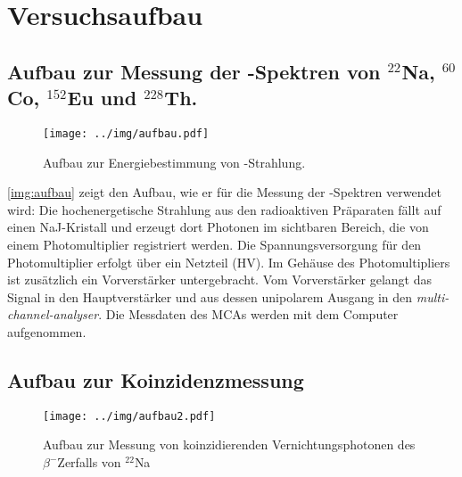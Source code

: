 \section{Versuchsaufbau}

\subsection{Aufbau zur Messung der \textgamma-Spektren von \texorpdfstring{${}^{22}$Na, ${}^{60}$Co, ${}^{152}$Eu und ${}^{228}$Th}{22-Na, 60-Co, 152-Eu und 228-Th}.}

\begin{figure}[H]
\begin{center}
  \texttt{[image: ../img/aufbau.pdf]}
  \caption[---]{Aufbau zur Energiebestimmung von \textgamma-Strahlung.}
  \label{img:aufbau}
\end{center}
\end{figure}

\autoref{img:aufbau} zeigt den Aufbau, wie er für die Messung der \textgamma-Spektren verwendet wird:
Die hochenergetische Strahlung aus den radioaktiven Präparaten fällt auf einen NaJ-Kristall und
erzeugt dort Photonen im sichtbaren Bereich, die von einem Photomultiplier registriert werden.
Die Spannungsversorgung für den Photomultiplier erfolgt über ein Netzteil (HV).
Im Gehäuse des Photomultipliers ist zusätzlich ein Vorverstärker untergebracht.
Vom Vorverstärker gelangt das Signal in den Hauptverstärker und aus dessen unipolarem Ausgang
in den \emph{multi-channel-analyser}.
Die Messdaten des MCAs werden mit dem Computer aufgenommen.


\subsection{Aufbau zur Koinzidenzmessung}

\begin{figure}[H]
\begin{center}
  \texttt{[image: ../img/aufbau2.pdf]}
  \caption[---]{Aufbau zur Messung von koinzidierenden Vernichtungsphotonen
  des $\beta^-$Zerfalls von ${}^{22}$Na}
  \label{img:aufbau2}
\end{center}
\end{figure}


